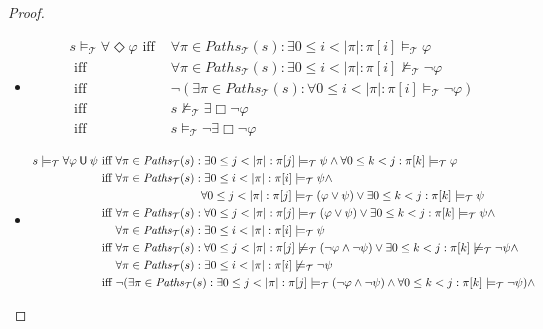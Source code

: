 \documentclass[12pt]{article}
\newcommand{\always}{\Box}
\newcommand{\eventually}{\Diamond}
\newcommand{\until}{\mathbin{\sf U}}
\theoremstyle{definition}
\begin{document}
\begin{proof}
\begin{itemize}
\item
\begin{align*}
s \models_{\mathcal{T}} \forall \eventually \varphi
\mbox{ iff } & \forall \pi \in \mathit{Paths}_{\mathcal{T}}(s) : \exists 0 \leq i < |\pi| : \pi[i] \models_{\mathcal{T}} \varphi\\
\mbox{ iff } & \forall \pi \in \mathit{Paths}_{\mathcal{T}}(s) : \exists 0 \leq i < |\pi| : \pi[i] \not\models_{\mathcal{T}} \neg \varphi\\
\mbox{ iff } & \neg(\exists \pi \in \mathit{Paths}_{\mathcal{T}}(s) : \forall 0 \leq i < |\pi| : \pi[i] \models_{\mathcal{T}} \neg \varphi)\\
\mbox{ iff } & s \not\models_{\mathcal{T}} \exists \always \neg \varphi\\
\mbox{ iff } & s \models_{\mathcal{T}} \neg \exists \always \neg \varphi
\end{align*}
\item
\begin{align*}
s \models_{\mathcal{T}} \forall \varphi \until \psi
\mbox{ iff } & \forall \pi \in \mathit{Paths}_{\mathcal{T}}(s) : \exists 0 \leq j < |\pi| : \pi[j] \models_{\mathcal{T}} \psi \wedge \forall 0 \leq k < j : \pi[k] \models_{\mathcal{T}} \varphi\\
\mbox{ iff } & \forall \pi \in \mathit{Paths}_{\mathcal{T}}(s) : \exists 0 \leq i < |\pi| : \pi[i] \models_{\mathcal{T}} \psi \wedge\\
& \phantom{\forall \pi \in \mathit{Paths}_{\mathcal{T}}(s) :} \forall 0 \leq j < |\pi| : \pi[j] \models_{\mathcal{T}} (\varphi \vee \psi) \vee \exists 0 \leq k < j : \pi[k] \models_{\mathcal{T}} \psi\\
\mbox{ iff } & \forall \pi \in \mathit{Paths}_{\mathcal{T}}(s) : \forall 0 \leq j < |\pi| : \pi[j] \models_{\mathcal{T}} (\varphi \vee \psi) \vee \exists 0 \leq k < j : \pi[k] \models_{\mathcal{T}} \psi \wedge\\
& \forall \pi \in \mathit{Paths}_{\mathcal{T}}(s) : \exists 0 \leq i < |\pi| : \pi[i] \models_{\mathcal{T}} \psi\\
\mbox{ iff } & \forall \pi \in \mathit{Paths}_{\mathcal{T}}(s) : \forall 0 \leq j < |\pi| : \pi[j] \not\models_{\mathcal{T}} (\neg \varphi \wedge \neg \psi) \vee \exists 0 \leq k < j : \pi[k] \not\models_{\mathcal{T}} \neg \psi \wedge\\
& \forall \pi \in \mathit{Paths}_{\mathcal{T}}(s) : \exists 0 \leq i < |\pi| : \pi[i] \not\models_{\mathcal{T}} \neg \psi\\
\mbox{ iff } & \neg (\exists \pi \in \mathit{Paths}_{\mathcal{T}}(s) : \exists 0 \leq j < |\pi| : \pi[j] \models_{\mathcal{T}} (\neg \varphi \wedge \neg \psi) \wedge \forall 0 \leq k < j : \pi[k] \models_{\mathcal{T}} \neg \psi) \wedge\\

\end{align*}
\end{itemize}
\end{proof}
\end{document}
